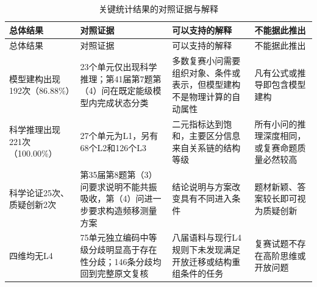 \documentclass[
  12pt,
  a4paper,twoside,openany]{ctexbook}
\begin{document}
\begin{longtable}[]{@{}
  >{\raggedright\arraybackslash}p{}
  >{\raggedright\arraybackslash}p{}
  >{\raggedright\arraybackslash}p{}
  >{\raggedright\arraybackslash}p{}@{}}
\caption{关键统计结果的对照证据与解释}\tabularnewline
\toprule\noalign{}
\rowcolor{ThesisPale}
\begin{minipage}[b]{\linewidth}\raggedright
总体结果
\end{minipage} & \begin{minipage}[b]{\linewidth}\raggedright
对照证据
\end{minipage} & \begin{minipage}[b]{\linewidth}\raggedright
可以支持的解释
\end{minipage} & \begin{minipage}[b]{\linewidth}\raggedright
不能据此推出
\end{minipage} \\
\midrule\noalign{}
\endfirsthead
\toprule\noalign{}
\rowcolor{ThesisPale}
\begin{minipage}[b]{\linewidth}\raggedright
总体结果
\end{minipage} & \begin{minipage}[b]{\linewidth}\raggedright
对照证据
\end{minipage} & \begin{minipage}[b]{\linewidth}\raggedright
可以支持的解释
\end{minipage} & \begin{minipage}[b]{\linewidth}\raggedright
不能据此推出
\end{minipage} \\
\midrule\noalign{}
\endhead
\bottomrule\noalign{}
\endlastfoot
模型建构出现192次（86.88\%） &
23个单元仅出现科学推理；第41届第7题第（4）问在既定能级模型内完成状态分类
& 多数复赛小问需要组织对象、条件或表示，但模型建构不是物理计算的自动属性
& 凡有公式或推导即包含模型建构 \\
科学推理出现221次（100.00\%） & 27个单元为L1，另有68个L2和126个L3 &
二元指标达到饱和，主要区分信息来自关系链的结构等级 &
所有小问的推理深度相同，或复赛命题质量必然较高 \\
科学论证25次、质疑创新2次 &
第35届第8题第（3）问要求说明不能共振吸收，第（4）问进一步要求构造频移测量方案
& 结论说明与方案改变具有不同进入条件 &
题材新颖、答案较长即可视为质疑创新 \\
四维均无L4 &
75单元独立编码中等级分歧明显高于存在性分歧；146条分歧均回到完整原文复核
& 八届语料与现行L4规则下未发现满足开放迁移或结构重组条件的任务 &
复赛试题不存在高阶思维或开放问题 \\
\end{longtable}
\end{document}
